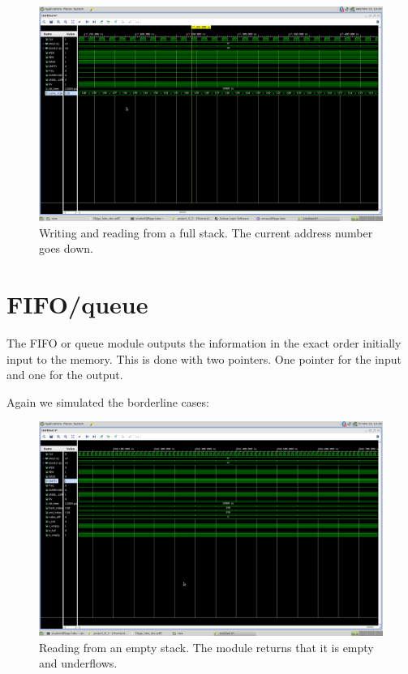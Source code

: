 \begin{figure}
    \includegraphics[width=.9\textwidth]{L8/E2/sim_read_write_full.png}
    \caption{Writing and reading from a full stack. The current address number goes down.}
    \label{pic: w and r from f stack}
\end{figure}

\newpage

\section{FIFO/queue}

The FIFO or queue module outputs the information in the exact order initially input to the memory. This is done with two pointers. One pointer for the input and one for the output.







Again we simulated the borderline cases:

\begin{figure}
    \includegraphics[width=.9\textwidth]{L8/E3/empty_read.png}
    \caption{Reading from an empty stack. The module returns that it is empty and underflows.}
    \label{pic: r from e stack fifo}
\end{figure}

